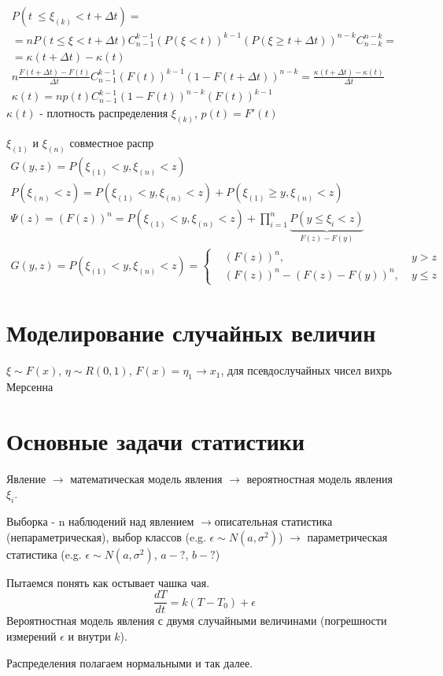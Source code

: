 \documentclass{article}
\begin{document}
\begin{gather*}
  P(t\ \le \xi_{(k)} < t + \Delta t)= \\
  =nP(t\le \xi<t+\Delta t)C_{n-1}^{k-1}(P(\xi<t))^{k-1}(P(\xi \ge t+\Delta t))^{n-k}C_{n-k}^{n-k}= \\
  =\kappa(t+\Delta t) - \kappa(t) \\ 
  n\frac{F(t+\Delta t)-F(t)}{\Delta t}C_{n-1}^{k-1}(F(t))^{k-1}(1-F(t+\Delta t))^{n-k}=\frac{\kappa(t+\Delta t)-\kappa(t)}{\Delta t}\\ 
  \kappa(t)=np(t)C_{n-1}^{k-1}(1-F(t))^{n-k}(F(t))^{k-1}
\end{gather*}
$\kappa(t)$ - плотность распределения $\xi_{(k)}$, $p(t)=F'(t)$

$\xi_{(1)}$ и $\xi_{(n)}$ совместное распр
\begin{gather*}
  G(y,z)=P(\xi_{(1)}<y,\xi_{(n)}<z) \\ 
  P(\xi_{(n)}<z)=P(\xi_{(1)}<y, \xi_{(n)} < z) + P(\xi_{(1)} \ge y, \xi_{(n)} < z) \\ 
  \Psi(z)=(F(z))^{n}=P(\xi_{(1)}<y,\xi_{(n)}<z)+\prod_{i=1}^{n}\underbrace{P(y \le \xi_i < z)}_{F(z)-F(y)} \\ 
  G(y,z)=P(\xi_{(1)}<y,\xi_{(n)}<z)=\left\{\begin{aligned}
      &(F(z))^{n},\; & y > z \\ 
      &(F(z))^{n}-(F(z)-F(y))^{n}, \; & y\le z
  \end{aligned}\right.
\end{gather*}

\section{Моделирование случайных величин}
$\xi\sim F(x)$, $\eta\sim R(0,1)$, $F(x)=\eta_1 \to x_1$, 
для псевдослучайных чисел вихрь Мерсенна

\section{Основные задачи статистики}
Явление $\rightarrow$ математическая модель явления $\rightarrow$ вероятностная модель явления $\xi_i$.

Выборка - n наблюдений над явлением 
$\rightarrow$описательная статистика (непараметрическая), выбор классов (e.g. $\epsilon \sim N(a,\sigma^{2})$)
$\rightarrow$ параметрическая статистика (e.g. $\epsilon\sim N(a,\sigma^{2})$, $a-?$, $b-?$)

\begin{eg}
  Пытаемся понять как остывает чашка чая.
  \[
    \frac{dT}{dt}=k(T-T_0)+\epsilon
  \]
  Вероятностная модель явления с двумя случайными величинами
  (погрешности измерений $\epsilon$ и внутри $k$).

  Распределения полагаем нормальными и так далее.
\end{eg}
\end{document}
